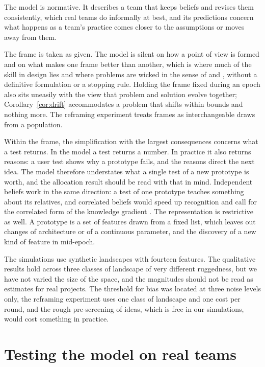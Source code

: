\documentclass[10pt,twocolumn]{article}
\theoremstyle{definition}
\begin{document}
The model is normative. It describes a team that keeps beliefs and revises them consistently, which real teams do informally at best, and its predictions concern what happens as a team's practice comes closer to the assumptions or moves away from them.

The frame is taken as given. The model is silent on how a point of view is formed and on what makes one frame better than another, which is where much of the skill in design lies and where problems are wicked in the sense of \citet{rittel1973} and \citet{buchanan1992}, without a definitive formulation or a stopping rule. Holding the frame fixed during an epoch also sits uneasily with the view that problem and solution evolve together; Corollary~\ref{cor:drift} accommodates a problem that shifts within bounds and nothing more. The reframing experiment treats frames as interchangeable draws from a population.

Within the frame, the simplification with the largest consequences concerns what a test returns. In the model a test returns a number. In practice it also returns reasons: a user test shows why a prototype fails, and the reasons direct the next idea. The model therefore understates what a single test of a new prototype is worth, and the allocation result should be read with that in mind. Independent beliefs work in the same direction: a test of one prototype teaches something about its relatives, and correlated beliefs would speed up recognition and call for the correlated form of the knowledge gradient \citep{frazier2009}. The representation is restrictive as well. A prototype is a set of features drawn from a fixed list, which leaves out changes of architecture or of a continuous parameter, and the discovery of a new kind of feature in mid-epoch.

The simulations use synthetic landscapes with fourteen features. The qualitative results hold across three classes of landscape of very different ruggedness, but we have not varied the size of the space, and the magnitudes should not be read as estimates for real projects. The threshold for bias was located at three noise levels only, the reframing experiment uses one class of landscape and one cost per round, and the rough pre-screening of ideas, which is free in our simulations, would cost something in practice.

\section{Testing the model on real teams}
\label{sec:empirical}
\end{document}
